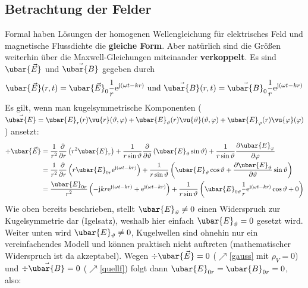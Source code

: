   \subsection{Betrachtung der Felder}
 Formal haben Lösungen der homogenen Wellengleichung für elektrisches Feld und magnetische Flussdichte die \textbf{gleiche Form}. Aber natürlich sind die Größen weiterhin über die Maxwell-Gleichungen miteinander \textbf{verkoppelt}. Es sind \(\ubar{\vec{E}}\) und \(\vec{\ubar{B}}\) gegeben durch
		        \begin{equation}
			        \ubar{\vec{E}}(r, t) = \ubar{\vec{E}}_0 \frac{1}{r}  \mathrm{e}^{\mathrm{j}(\omega t - kr)} \text{ und } \vec{\ubar{B}}(r, t) = \vec{\ubar{B}}_0 \frac{1}{r}  \mathrm{e}^{\mathrm{j}(\omega t - kr)}
		        \end{equation}
		        Es gilt, wenn man kugelsymmetrische Komponenten ($\vec{\ubar{E}}=\ubar{E}_r (r) \vu{r}(\vartheta,\varphi)+ \ubar{E}_\vartheta (r) \vu{\vartheta}(\vartheta,\varphi) + \ubar{E}_\varphi (r) \vu{\varphi}(\varphi)$) ansetzt:
		     \begin{equation}\begin{split}
		    		\div \ubar{\vec{E}}&=\frac{1}{r^2} \frac{\partial}{\partial r}\left(r^2 \ubar{E}_r\right)+\frac{1}{r \sin \vartheta} \frac{\partial}{\partial \vartheta}\left(\ubar{E}_{\vartheta} \sin \vartheta\right)        	+\frac{1}{r \sin \vartheta} \frac{\partial \ubar{E}_{\varphi}}{\partial \varphi}\\
		    		&=\frac{1}{r^2} \frac{\partial}{\partial r}\left(r \ubar{E}_{0r}  \mathrm{e}^{\mathrm{j}(\omega t - kr)}\right)+\frac{1}{r \sin \vartheta} \left(\ubar{E}_{\vartheta} \cos \vartheta + \frac{\partial \ubar{E}_{\vartheta}}{\partial \vartheta}\sin\vartheta\right)       \\
		    		&=\frac{\ubar{E}_{0r}}{r^2} \left(-\mathrm{j}kr   \mathrm{e}^{\mathrm{j}(\omega t - kr)}+ \mathrm{e}^{\mathrm{j}(\omega t - kr)}\right)+\frac{1}{r \sin \vartheta} \left(\ubar{E}_{0\vartheta} \frac{1}{r}  \mathrm{e}^{\mathrm{j}(\omega t - kr)} \cos \vartheta + 0\right) 
		    	\end{split}\end{equation}
	        Wie oben bereits beschrieben, stellt $\ubar{E}_{\vartheta}\neq0$ einen Widerspruch zur Kugelsymmetrie dar (Igelsatz), weshalb hier einfach $\ubar{E}_{\vartheta}=0$ gesetzt wird. Weiter unten wird $\ubar{E}_{\vartheta}\neq0$, Kugelwellen sind ohnehin nur ein vereinfachendes Modell und können praktisch nicht auftreten (mathematischer Widerspruch ist da akzeptabel). Wegen \(\div \ubar{\vec{E}} = 0\) ($\nearrow$\ref{gauss} mit $\rho_{V}=0$) und \(\div \vec{\ubar{B}}=0\) ($\nearrow$\ref{quellf}) folgt dann $\ubar{E}_{0r}=\ubar{B}_{0r}=0$, also:
